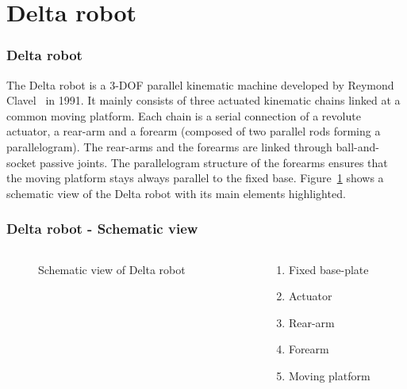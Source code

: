 %
\section[Delta robot]{Delta robot}
\begin{frame}
\frametitle{Delta robot}
The Delta robot is a 3-DOF parallel kinematic machine developed by Reymond Clavel~ in 1991. It mainly consists of three actuated kinematic chains linked at a common moving platform. Each chain is a serial connection of a revolute actuator, a rear-arm and a forearm (composed of two parallel rods forming a parallelogram). The rear-arms and the forearms are linked through ball-and-socket passive joints. The parallelogram structure of the forearms ensures that the moving platform stays always parallel to the fixed base.
Figure~\ref{Delta_schematic} shows a schematic view of the Delta robot with its main elements highlighted.
\end{frame}
%
\begin{frame}
\frametitle{Delta robot - Schematic view}
\begin{columns}
    \begin{column}{0.5\textwidth}
		\vspace*{.6cm}
    	\begin{figure}
    		\caption{Schematic view of Delta robot}
    		\label{Delta_schematic}
    	\end{figure}
    \end{column}
    \begin{column}{0.5\textwidth}
        \begin{enumerate}
        	\item Fixed base-plate
        	\item Actuator
        	\item Rear-arm
        	\item Forearm
        	\item Moving platform
        \end{enumerate}
    \end{column}
\end{columns}
\end{frame}
